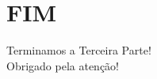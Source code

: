 \documentclass{libs/ufc_format}
\begin{document}
\section{FIM}

\begin{frame}{}
    \centering
    \Large
    Terminamos a Terceira Parte!\\
    Obrigado pela atenção!
\end{frame}

\end{document}
